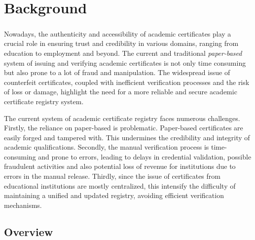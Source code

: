%
%
\chapter{Background}\label{chap:background}
\paragraph{}

Nowadays, the authenticity and accessibility of academic certificates play a crucial role in ensuring trust and credibility in various
domains, ranging from education to employment and beyond.
The current and traditional \textit{paper-based} system of issuing and verifying academic certificates is not only time consuming but also prone to a lot of fraud and manipulation.
The widespread issue of counterfeit certificates\cite{certCounterfeitAdv, certCounterfeitRid}, coupled with inefficient verification processes and the risk of loss or damage, highlight the need for a more reliable and secure academic certificate registry system.

The current system of academic certificate registry faces numerous challenges. Firstly, the reliance on paper-based is problematic. Paper-based certificates are easily forged and tampered with. This undermines the credibility and integrity of academic qualifications. Secondly, the manual verification process is
time-consuming and prone to errors, leading to delays in credential validation, possible fraudulent activities and also potential loss of revenue for institutions due to
errors in the manual release. Thirdly, since the issue of certificates from educational institutions are mostly centralized, this intensify the difficulty
of maintaining a unified and updated registry, avoiding efficient verification mechanisms.

\section{Overview}\label{sec:overview}
\paragraph{}

